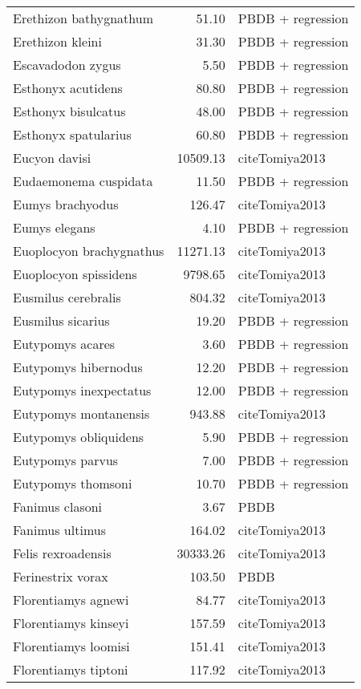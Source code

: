 \begin{table}[ht]
\begin{tabular}{lrl}
  Erethizon bathygnathum & 51.10 & PBDB + regression \\ 
  Erethizon kleini & 31.30 & PBDB + regression \\ 
  Escavadodon zygus & 5.50 & PBDB + regression \\ 
  Esthonyx acutidens & 80.80 & PBDB + regression \\ 
  Esthonyx bisulcatus & 48.00 & PBDB + regression \\ 
  Esthonyx spatularius & 60.80 & PBDB + regression \\ 
  Eucyon davisi & 10509.13 & cite{Tomiya2013} \\ 
  Eudaemonema cuspidata & 11.50 & PBDB + regression \\ 
  Eumys brachyodus & 126.47 & cite{Tomiya2013} \\ 
  Eumys elegans & 4.10 & PBDB + regression \\ 
  Euoplocyon brachygnathus & 11271.13 & cite{Tomiya2013} \\ 
  Euoplocyon spissidens & 9798.65 & cite{Tomiya2013} \\ 
  Eusmilus cerebralis & 804.32 & cite{Tomiya2013} \\ 
  Eusmilus sicarius & 19.20 & PBDB + regression \\ 
  Eutypomys acares & 3.60 & PBDB + regression \\ 
  Eutypomys hibernodus & 12.20 & PBDB + regression \\ 
  Eutypomys inexpectatus & 12.00 & PBDB + regression \\ 
  Eutypomys montanensis & 943.88 & cite{Tomiya2013} \\ 
  Eutypomys obliquidens & 5.90 & PBDB + regression \\ 
  Eutypomys parvus & 7.00 & PBDB + regression \\ 
  Eutypomys thomsoni & 10.70 & PBDB + regression \\ 
  Fanimus clasoni & 3.67 & PBDB \\ 
  Fanimus ultimus & 164.02 & cite{Tomiya2013} \\ 
  Felis rexroadensis & 30333.26 & cite{Tomiya2013} \\ 
  Ferinestrix vorax & 103.50 & PBDB \\ 
  Florentiamys agnewi & 84.77 & cite{Tomiya2013} \\ 
  Florentiamys kinseyi & 157.59 & cite{Tomiya2013} \\ 
  Florentiamys loomisi & 151.41 & cite{Tomiya2013} \\ 
  Florentiamys tiptoni & 117.92 & cite{Tomiya2013} \\ 

\end{tabular}
\end{table}
